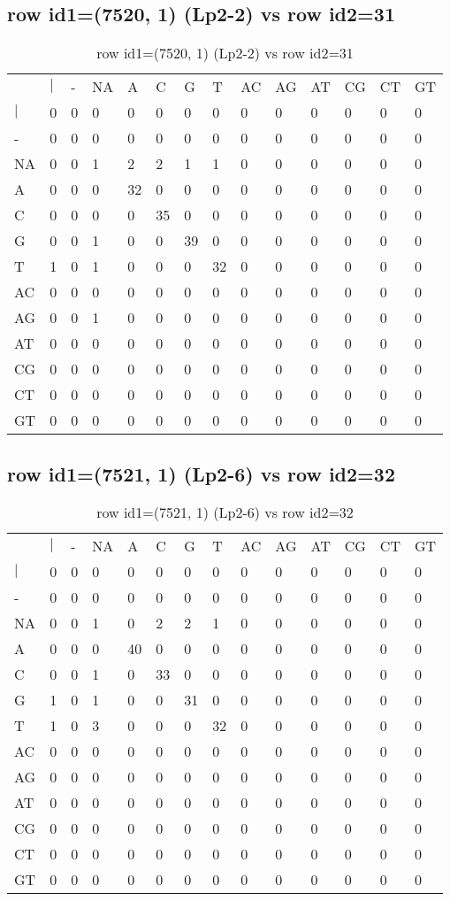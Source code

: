 \subsection{row id1=(7520, 1) (Lp2-2) vs row id2=31}
\begin{center}
\begin{longtable}{|l|l|l|l|l|l|l|l|l|l|l|l|l|l|}
\caption{row id1=(7520, 1) (Lp2-2) vs row id2=31} \label{table_dm330}\\
\hline
\\
\hline
&$|$&-&NA&A&C&G&T&AC&AG&AT&CG&CT&GT\\
$|$&0&0&0&0&0&0&0&0&0&0&0&0&0\\
-&0&0&0&0&0&0&0&0&0&0&0&0&0\\
NA&0&0&1&2&2&1&1&0&0&0&0&0&0\\
A&0&0&0&32&0&0&0&0&0&0&0&0&0\\
C&0&0&0&0&35&0&0&0&0&0&0&0&0\\
G&0&0&1&0&0&39&0&0&0&0&0&0&0\\
T&1&0&1&0&0&0&32&0&0&0&0&0&0\\
AC&0&0&0&0&0&0&0&0&0&0&0&0&0\\
AG&0&0&1&0&0&0&0&0&0&0&0&0&0\\
AT&0&0&0&0&0&0&0&0&0&0&0&0&0\\
CG&0&0&0&0&0&0&0&0&0&0&0&0&0\\
CT&0&0&0&0&0&0&0&0&0&0&0&0&0\\
GT&0&0&0&0&0&0&0&0&0&0&0&0&0\\
\hline
\end{longtable}
\end{center}

\subsection{row id1=(7521, 1) (Lp2-6) vs row id2=32}
\begin{center}
\begin{longtable}{|l|l|l|l|l|l|l|l|l|l|l|l|l|l|}
\caption{row id1=(7521, 1) (Lp2-6) vs row id2=32} \label{table_dm332}\\
\hline
\\
\hline
&$|$&-&NA&A&C&G&T&AC&AG&AT&CG&CT&GT\\
$|$&0&0&0&0&0&0&0&0&0&0&0&0&0\\
-&0&0&0&0&0&0&0&0&0&0&0&0&0\\
NA&0&0&1&0&2&2&1&0&0&0&0&0&0\\
A&0&0&0&40&0&0&0&0&0&0&0&0&0\\
C&0&0&1&0&33&0&0&0&0&0&0&0&0\\
G&1&0&1&0&0&31&0&0&0&0&0&0&0\\
T&1&0&3&0&0&0&32&0&0&0&0&0&0\\
AC&0&0&0&0&0&0&0&0&0&0&0&0&0\\
AG&0&0&0&0&0&0&0&0&0&0&0&0&0\\
AT&0&0&0&0&0&0&0&0&0&0&0&0&0\\
CG&0&0&0&0&0&0&0&0&0&0&0&0&0\\
CT&0&0&0&0&0&0&0&0&0&0&0&0&0\\
GT&0&0&0&0&0&0&0&0&0&0&0&0&0\\
\hline
\end{longtable}
\end{center}

